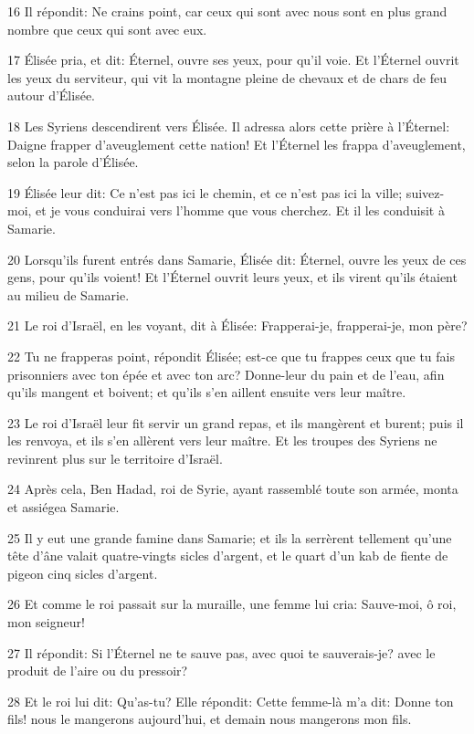 \par 16 Il répondit: Ne crains point, car ceux qui sont avec nous sont en plus grand nombre que ceux qui sont avec eux.
\par 17 Élisée pria, et dit: Éternel, ouvre ses yeux, pour qu'il voie. Et l'Éternel ouvrit les yeux du serviteur, qui vit la montagne pleine de chevaux et de chars de feu autour d'Élisée.
\par 18 Les Syriens descendirent vers Élisée. Il adressa alors cette prière à l'Éternel: Daigne frapper d'aveuglement cette nation! Et l'Éternel les frappa d'aveuglement, selon la parole d'Élisée.
\par 19 Élisée leur dit: Ce n'est pas ici le chemin, et ce n'est pas ici la ville; suivez-moi, et je vous conduirai vers l'homme que vous cherchez. Et il les conduisit à Samarie.
\par 20 Lorsqu'ils furent entrés dans Samarie, Élisée dit: Éternel, ouvre les yeux de ces gens, pour qu'ils voient! Et l'Éternel ouvrit leurs yeux, et ils virent qu'ils étaient au milieu de Samarie.
\par 21 Le roi d'Israël, en les voyant, dit à Élisée: Frapperai-je, frapperai-je, mon père?
\par 22 Tu ne frapperas point, répondit Élisée; est-ce que tu frappes ceux que tu fais prisonniers avec ton épée et avec ton arc? Donne-leur du pain et de l'eau, afin qu'ils mangent et boivent; et qu'ils s'en aillent ensuite vers leur maître.
\par 23 Le roi d'Israël leur fit servir un grand repas, et ils mangèrent et burent; puis il les renvoya, et ils s'en allèrent vers leur maître. Et les troupes des Syriens ne revinrent plus sur le territoire d'Israël.
\par 24 Après cela, Ben Hadad, roi de Syrie, ayant rassemblé toute son armée, monta et assiégea Samarie.
\par 25 Il y eut une grande famine dans Samarie; et ils la serrèrent tellement qu'une tête d'âne valait quatre-vingts sicles d'argent, et le quart d'un kab de fiente de pigeon cinq sicles d'argent.
\par 26 Et comme le roi passait sur la muraille, une femme lui cria: Sauve-moi, ô roi, mon seigneur!
\par 27 Il répondit: Si l'Éternel ne te sauve pas, avec quoi te sauverais-je? avec le produit de l'aire ou du pressoir?
\par 28 Et le roi lui dit: Qu'as-tu? Elle répondit: Cette femme-là m'a dit: Donne ton fils! nous le mangerons aujourd'hui, et demain nous mangerons mon fils.
